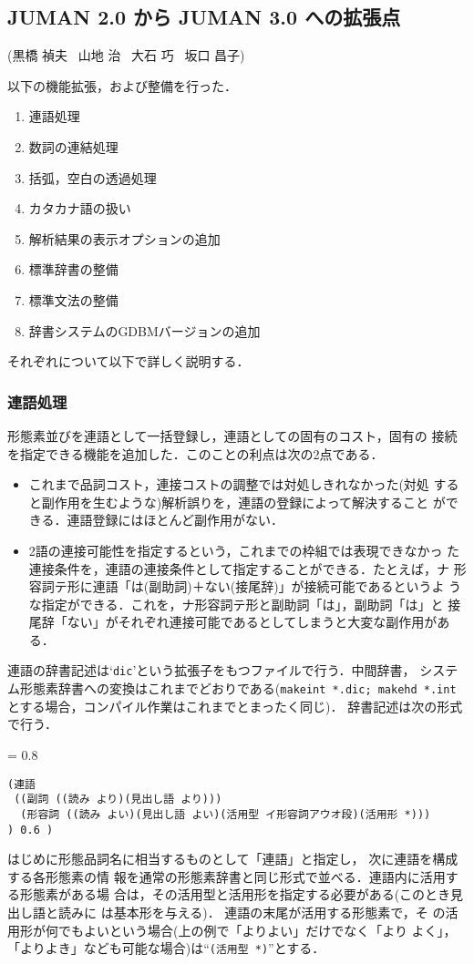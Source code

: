 \documentclass[a4j,titlepage]{jarticle}
\begin{document}
\subsection{JUMAN 2.0 から JUMAN 3.0 への拡張点}
{\hfill (黒橋 禎夫 \ 山地 治 \ 大石 巧 \ 坂口 昌子)}

以下の機能拡張，および整備を行った．
\begin{enumerate}
\item 連語処理
\item 数詞の連結処理
\item 括弧，空白の透過処理
\item カタカナ語の扱い
\item 解析結果の表示オプションの追加
\item 標準辞書の整備
\item 標準文法の整備
\item 辞書システムのGDBMバージョンの追加
\end{enumerate}
それぞれについて以下で詳しく説明する．

\subsubsection{連語処理}

形態素並びを連語として一括登録し，連語としての固有のコスト，固有の
接続を指定できる機能を追加した．このことの利点は次の2点である．
\begin{itemize}
\item これまで品詞コスト，連接コストの調整では対処しきれなかった(対処
  すると副作用を生むような)解析誤りを，連語の登録によって解決すること
  ができる．連語登録にはほとんど副作用がない．
\item 2語の連接可能性を指定するという，これまでの枠組では表現できなかっ
  た連接条件を，連語の連接条件として指定することができる．たとえば，ナ
  形容詞テ形に連語「は(副助詞)＋ない(接尾辞)」が接続可能であるというよ
  うな指定ができる．これを，ナ形容詞テ形と副助詞「は」，副助詞「は」と
  接尾辞「ない」がそれぞれ連接可能であるとしてしまうと大変な副作用があ
  る．
\end{itemize}

連語の辞書記述は`{\tt dic}'という拡張子をもつファイルで行う．中間辞書，
システム形態素辞書への変換はこれまでどおりである({\tt makeint
*.dic; makehd *.int} とする場合，コンパイル作業はこれまでとまったく同じ)．
辞書記述は次の形式で行う．
{\baselineskip = 0.8 \baselineskip
\begin{verbatim}
(連語
 ((副詞 ((読み より)(見出し語 より)))
  (形容詞 ((読み よい)(見出し語 よい)(活用型 イ形容詞アウオ段)(活用形 *)))
) 0.6 )
\end{verbatim}}
はじめに形態品詞名に相当するものとして「連語」と指定し，
次に連語を構成する各形態素の情
報を通常の形態素辞書と同じ形式で並べる．連語内に活用する形態素がある場
合は，その活用型と活用形を指定する必要がある(このとき見出し語と読みに
は基本形を与える)．
連語の末尾が活用する形態素で，そ
の活用形が何でもよいという場合(上の例で「よりよい」だけでなく「より
よく」，「よりよき」なども可能な場合)は``{\tt (活用型 *)}''とする．
\end{document}
